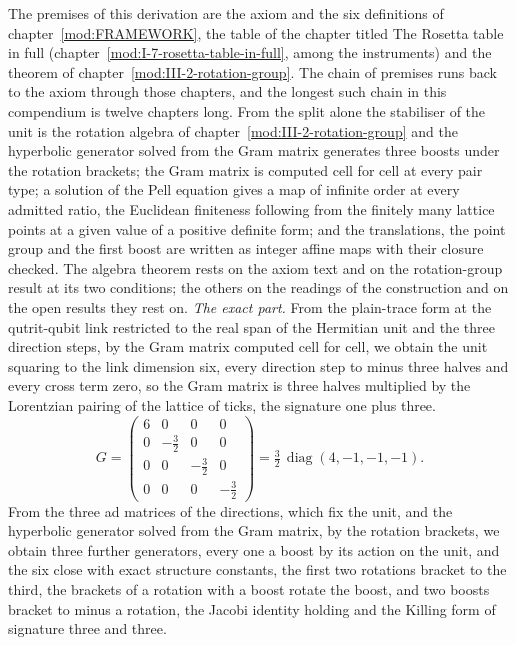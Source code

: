\begin{chproof}
The premises of this derivation are the axiom and the six definitions of chapter~\ref{mod:FRAMEWORK}, the table of the chapter titled The Rosetta table in full (chapter~\ref{mod:I-7-rosetta-table-in-full}, among the instruments) and the theorem of chapter~\ref{mod:III-2-rotation-group}. The chain of premises runs back to the axiom through those chapters, and the longest such chain in this compendium is twelve chapters long.
From the split alone the stabiliser of the unit is the rotation algebra of chapter~\ref{mod:III-2-rotation-group} and the hyperbolic generator solved from the Gram matrix generates three boosts under the rotation brackets; the Gram matrix is computed cell for cell at every pair type; a solution of the Pell equation gives a map of infinite order at every admitted ratio, the Euclidean finiteness following from the finitely many lattice points at a given value of a positive definite form; and the translations, the point group and the first boost are written as integer affine maps with their closure checked. The algebra theorem rests on the axiom text and on the rotation-group result at its two conditions; the others on the readings of the construction and on the open results they rest on.
\textit{The exact part.}
From the plain-trace form at the qutrit-qubit link restricted to the real span of the Hermitian unit and the three direction steps, by the Gram matrix computed cell for cell, we obtain the unit squaring to the link dimension six, every direction step to minus three halves and every cross term zero, so the Gram matrix is three halves multiplied by the Lorentzian pairing of the lattice of ticks, the signature one plus three.
\begin{equation}
G = \begin{pmatrix} 6 & 0 & 0 & 0 \\ 0 & -\tfrac{3}{2} & 0 & 0 \\ 0 & 0 & -\tfrac{3}{2} & 0 \\ 0 & 0 & 0 & -\tfrac{3}{2} \end{pmatrix} = \tfrac{3}{2}\,\operatorname{diag}(4, -1, -1, -1) .
\end{equation}
From the three ad matrices of the directions, which fix the unit, and the hyperbolic generator solved from the Gram matrix, by the rotation brackets, we obtain three further generators, every one a boost by its action on the unit, and the six close with exact structure constants, the first two rotations bracket to the third, the brackets of a rotation with a boost rotate the boost, and two boosts bracket to minus a rotation, the Jacobi identity holding and the Killing form of signature three and three.

\end{chproof}
